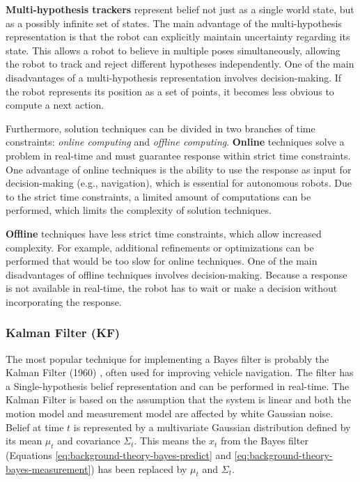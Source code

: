 \textbf{Multi-hypothesis trackers} represent belief not just as a single world state, but as a possibly infinite set of states.
The main advantage of the multi-hypothesis representation is that the robot can explicitly maintain uncertainty regarding its state.
This allows a robot to believe in multiple poses simultaneously, allowing the robot to track and reject different hypotheses independently.
One of the main disadvantages of a multi-hypothesis representation involves decision-making.
If the robot represents its position as a set of points, it becomes less obvious to compute a next action.

Furthermore, solution techniques can be divided in two branches of time constraints: \textit{online computing} and \textit{offline computing}.
\textbf{Online} techniques solve a problem in real-time and must guarantee response within strict time constraints.
One advantage of online techniques is the ability to use the response as input for decision-making (e.g., navigation), which is essential for autonomous robots.
Due to the strict time constraints, a limited amount of computations can be performed, which limits the complexity of solution techniques.

\textbf{Offline} techniques have less strict time constraints, which allow increased complexity.
For example, additional refinements or optimizations can be performed that would be too slow for online techniques.
One of the main disadvantages of offline techniques involves decision-making.
Because a response is not available in real-time, the robot has to wait or make a decision without incorporating the response.


\subsubsection{Kalman Filter (KF)}
\label{sec:prob-rob-kf}
The most popular technique for implementing a Bayes filter is probably the Kalman Filter (1960) \cite{kalman1960new}, often used for improving vehicle navigation.
The filter has a Single-hypothesis belief representation and can be performed in real-time.
The Kalman Filter is based on the assumption that the system is linear and both the motion model and measurement model are affected by white Gaussian noise.
Belief at time $t$ is represented by a multivariate Gaussian distribution defined by its mean $\mu_t$ and covariance $\Sigma_t$.
This means the $x_t$ from the Bayes filter (Equations \eqref{eq:background-theory-bayes-predict} and \eqref{eq:background-theory-bayes-measurement}) has been replaced by $\mu_t$ and $\Sigma_t$.

